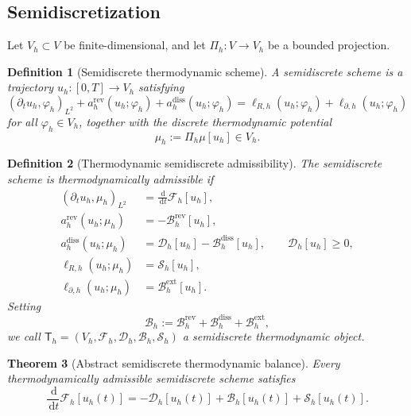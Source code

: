 \documentclass[11pt]{article}
\newtheorem{theorem}{Theorem}[section]
\newtheorem{definition}[theorem]{Definition}
\newcommand{\dd}{\,\mathrm{d}}
\newcommand{\F}{\mathcal{F}}
\newcommand{\Diss}{\mathcal{D}}
\newcommand{\Bnd}{\mathcal{B}}
\newcommand{\Src}{\mathcal{S}}
\begin{document}
\subsection{Semidiscretization}

Let \(V_h\subset V\) be finite-dimensional, and let \(\Pi_h:V\to V_h\) be a bounded
projection.

\begin{definition}[Semidiscrete thermodynamic scheme]
A semidiscrete scheme is a trajectory \(u_h:[0,T]\to V_h\) satisfying
\begin{equation}\label{eq:semi-scheme}
(\partial_t u_h,\varphi_h)_{L^2}
+
a_h^{\mathrm{rev}}(u_h;\varphi_h)
+
a_h^{\mathrm{diss}}(u_h;\varphi_h)
=
\ell_{R,h}(u_h;\varphi_h)+\ell_{\partial,h}(u_h;\varphi_h)
\end{equation}
for all \(\varphi_h\in V_h\), together with the discrete thermodynamic potential
\[
\mu_h:=\Pi_h \mu[u_h]\in V_h.
\]
\end{definition}

\begin{definition}[Thermodynamic semidiscrete admissibility]
The semidiscrete scheme is \emph{thermodynamically admissible} if
\begin{align}
(\partial_t u_h,\mu_h)_{L^2}
&=
\frac{\dd}{\dd t}\F_h[u_h],\label{eq:semi-chain}\\
a_h^{\mathrm{rev}}(u_h;\mu_h)
&=
-\Bnd_h^{\mathrm{rev}}[u_h],\label{eq:semi-rev}\\
a_h^{\mathrm{diss}}(u_h;\mu_h)
&=
\Diss_h[u_h]-\Bnd_h^{\mathrm{diss}}[u_h],
\qquad \Diss_h[u_h]\ge 0,\label{eq:semi-diss}\\
\ell_{R,h}(u_h;\mu_h)&=\Src_h[u_h],\label{eq:semi-source}\\
\ell_{\partial,h}(u_h;\mu_h)&=\Bnd_h^{\mathrm{ext}}[u_h].\label{eq:semi-bound}
\end{align}
Setting
\[
\Bnd_h:=\Bnd_h^{\mathrm{rev}}+\Bnd_h^{\mathrm{diss}}+\Bnd_h^{\mathrm{ext}},
\]
we call \(\mathsf{T}_h=(V_h,\F_h,\Diss_h,\Bnd_h,\Src_h)\) a semidiscrete
thermodynamic object.
\end{definition}

\begin{theorem}[Abstract semidiscrete thermodynamic balance]\label{thm:semi-balance}
Every thermodynamically admissible semidiscrete scheme satisfies
\begin{equation}\label{eq:semi-balance}
\frac{\dd}{\dd t}\F_h[u_h(t)]
=
-\Diss_h[u_h(t)] + \Bnd_h[u_h(t)] + \Src_h[u_h(t)].
\end{equation}
\end{theorem}
\end{document}

